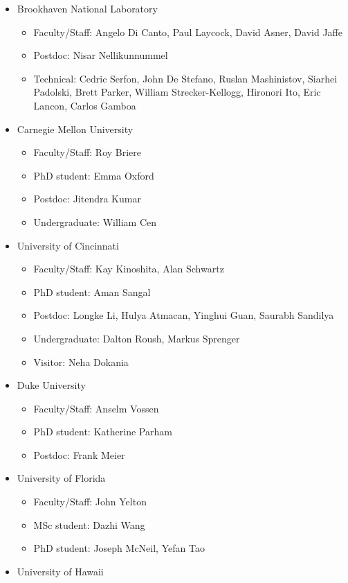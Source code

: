 \begin{itemize}
\item Brookhaven National Laboratory
\begin{itemize}

\item Faculty/Staff:  Angelo Di Canto, Paul Laycock, David Asner, David Jaffe
\item Postdoc:  Nisar Nellikunnummel
\item Technical:  Cedric Serfon, John De Stefano, Ruslan Mashinistov, Siarhei Padolski, Brett Parker, William Strecker-Kellogg, Hironori Ito, Eric Lancon, Carlos Gamboa
\end{itemize}
\item Carnegie Mellon University
\begin{itemize}

\item Faculty/Staff:  Roy Briere
\item PhD student:  Emma Oxford
\item Postdoc:  Jitendra Kumar
\item Undergraduate:  William Cen
\end{itemize}
\item University of Cincinnati
\begin{itemize}

\item Faculty/Staff:  Kay  Kinoshita, Alan Schwartz
\item PhD student:  Aman Sangal
\item Postdoc:  Longke Li, Hulya Atmacan, Yinghui Guan, Saurabh Sandilya
\item Undergraduate:  Dalton Roush, Markus Sprenger
\item Visitor:  Neha Dokania
\end{itemize}
\item Duke University
\begin{itemize}

\item Faculty/Staff:  Anselm Vossen
\item PhD student:  Katherine Parham
\item Postdoc:  Frank Meier
\end{itemize}
\item University of Florida
\begin{itemize}

\item Faculty/Staff:  John Yelton
\item MSc student:  Dazhi Wang
\item PhD student:  Joseph McNeil, Yefan Tao
\end{itemize}
\item University of Hawaii
\begin{itemize}


\end{itemize}
\end{itemize}

